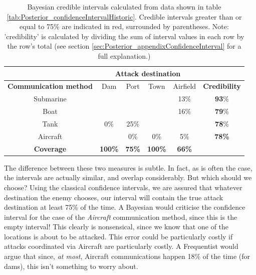 \documentclass[11pt,fullpage]{book}
\begin{document}
\begin{table}[htbp]
  \centering
    \begin{tabular}{cccccc}
    \toprule
          & \multicolumn{4}{c}{\textbf{Attack destination}} &  \\
    \midrule
    \textbf{Communication method} & Dam & Port & Town & Airfield   & \textbf{Credibility} \\
    Submarine & \color{red}{$[$73\%}  & \color{red}{50\%}  & \color{red}{50\%$]$}  & 13\%  & \textbf{93}\% \\
    Boat  & \color{red}{$[$9\%}   & \color{red}{25\%}  & \color{red}{25\%$]$}  & 16\%  & \textbf{79}\% \\
    Tank  & 0\%   & 25\%  & \color{red}{$[$25\%}  & \color{red}{66\%$]$}  & \textbf{78}\% \\
    Aircraft & \color{red}{$[$18\%$]$}   & 0\%  & 0\%   & 5\%   &\textbf{78\%} \\
    \bottomrule
    \textbf{Coverage} & \textbf{100\%}  & \textbf{75\%} &\textbf{ 100\%}  & \textbf{66\%}  &  \\
    \end{tabular}%
   \caption{Bayesian credible intervals calculated from data shown in table \ref{tab:Posterior_confidenceIntervalHistoric}. Credible intervals greater than or equal to 75\% are indicated in red, surrounded by parentheses. Note: 'credibility' is calculated by dividing the sum of interval values in each row by the row's total (see section \ref{sec:Posterior_appendixConfidenceInterval} for a full explanation.)}\label{tab:Posterior_confidenceIntervalBayesian}%
\end{table}%

The difference between these two measures is subtle. In fact, as is often the case, the intervals are actually similar, and overlap considerably. But which should we choose? Using the classical confidence intervals, we are assured that whatever destination the enemy chooses, our interval will contain the true attack destination at least 75\% of the time. A Bayesian would criticise the confidence interval for the case of the \textit{Aircraft} communication method, since this is the empty interval! This clearly is nonsensical, since we know that one of the locations is about to be attacked. This error could be particularly costly if attacks coordinated via Aircraft are particularly costly. A Frequentist would argue that since, \textit{at most}, Aircraft communications happen 18\% of the time (for dams), this isn't something to worry about.
\end{document}
